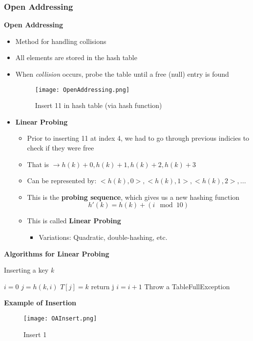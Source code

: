\documentclass[10pt, 
a4paper, 
oneside, 
headinclude, footinclude, 
BCOR5mm]
{scrartcl}
\begin{document}
\subsubsection{Open Addressing}
\begin{definition}
    \textbf{Open Addressing}
    \begin{itemize}
        \item Method for handling collisions
        \item All elements are stored in the hash table
        \item When \textit{collision} occurs, probe the table until a free (null) entry is found
        \begin{figure}[H]
            \begin{center}
                \texttt{[image: OpenAddressing.png]}
                \caption{Insert 11 in hash table (via hash function)}
            \end{center}
        \end{figure}
        \item \textbf{Linear Probing}
        \begin{itemize}
            \item Prior to inserting 11 at index 4, we had to go through previous indicies to check if they were free
            \item That is $\rightarrow h(k)+0, h(k)+1, h(k)+2, h(k)+3$
            \item Can be represented by: $<h(k),0>,<h(k),1>,<h(k),2>,...$
            \item This is the \textbf{probing sequence}, which gives us a new hashing function $$h'(k)=h(k)+(i \mod 10)$$
            \item This is called \textbf{Linear Probing}
            \begin{itemize}
                \item Variations: Quadratic, double-hashing, etc.
            \end{itemize} 
        \end{itemize}
    \end{itemize}
\end{definition}

\textbf{Algorithms for Linear Probing}
\begin{algorithm}
    \caption{Inserting a key \textit{k}}
    $i = 0$\;
        {$j=h(k,i)$\;
            {$T[j]=k$\;
            return j\;}
        $i=i+1$\;}
    Throw a TableFullException\;
\end{algorithm}
\textbf{Example of Insertion}
\begin{figure}[H]
    \begin{center}
        \texttt{[image: OAInsert.png]}
        \caption{Insert 1}
    \end{center}   
\end{figure}
\end{document}
